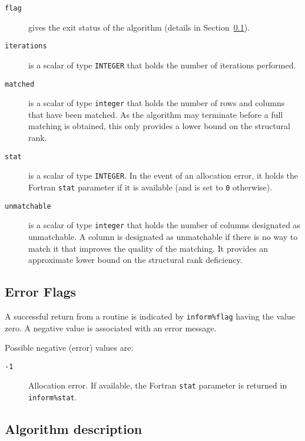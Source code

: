 \begin{description}

\item[\texttt{flag}] gives the exit status of the algorithm (details in Section~\ref{scaling:errors:auction}).

\item[\texttt{iterations}] is a scalar of type \texttt{INTEGER} that holds the number of iterations performed.

\item[\texttt{matched}] is a scalar of type \texttt{integer} that holds the number of rows and columns that have been matched. As the algorithm may terminate before a full matching is obtained, this only provides a lower bound on the structural rank.

\item[\texttt{stat}] is a scalar of type \texttt{INTEGER}. In the event of an allocation error, it holds the Fortran \texttt{stat} parameter if it is available (and is set to \texttt{0} otherwise).

\item[\texttt{unmatchable}] is a scalar of type \texttt{integer} that holds the number of columns designated as unmatchable. A column is designated as unmatchable if there is no way to match it that improves the quality of the matching. It provides an approximate lower bound on the structural rank deficiency.

\end{description}

\subsection{Error Flags} \label{scaling:errors:auction}
A successful return from a routine is indicated by \texttt{inform\%flag} having the value zero. A negative value is associated with an error message.

Possible negative (error) values are:
\begin{description}
\item[\texttt{-1}] Allocation error. If available, the Fortran \texttt{stat} parameter is returned in \texttt{inform\%stat}.
\end{description}

\subsection{Algorithm description} \label{scaling:method:auction}

